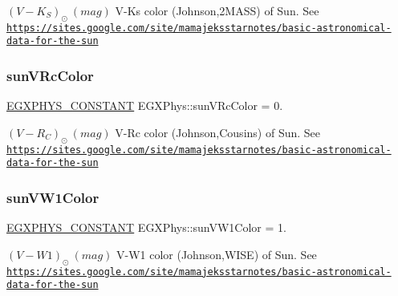 $ (V-K_S)_{\odot} \ (mag)$ V-\/\+Ks color (Johnson,2\+M\+A\+SS) of Sun. See \href{https://sites.google.com/site/mamajeksstarnotes/basic-astronomical-data-for-the-sun}{\tt https\+://sites.\+google.\+com/site/mamajeksstarnotes/basic-\/astronomical-\/data-\/for-\/the-\/sun} \mbox{\label{group___e_g_x_phys-_constants-_astrophysics-_solar_system-_sun-_magnitude_ga746af493327ed0a3ad4ebeead64fc1be}} 
\subsubsection{\texorpdfstring{sun\+V\+Rc\+Color}{sunVRcColor}}
{\footnotesize\ttfamily \mbox{\hyperlink{group___e_g_x_phys-_constants-_macros_ga76980d288494ce1714c9ac68a95ba702}{E\+G\+X\+P\+H\+Y\+S\+\_\+\+C\+O\+N\+S\+T\+A\+NT}} E\+G\+X\+Phys\+::sun\+V\+Rc\+Color = 0.}

$ (V-R_C)_{\odot} \ (mag)$ V-\/\+Rc color (Johnson,Cousins) of Sun. See \href{https://sites.google.com/site/mamajeksstarnotes/basic-astronomical-data-for-the-sun}{\tt https\+://sites.\+google.\+com/site/mamajeksstarnotes/basic-\/astronomical-\/data-\/for-\/the-\/sun} \mbox{\label{group___e_g_x_phys-_constants-_astrophysics-_solar_system-_sun-_magnitude_ga74b675ddfe282224b17cc86eebec62cd}} 
\subsubsection{\texorpdfstring{sun\+V\+W1\+Color}{sunVW1Color}}
{\footnotesize\ttfamily \mbox{\hyperlink{group___e_g_x_phys-_constants-_macros_ga76980d288494ce1714c9ac68a95ba702}{E\+G\+X\+P\+H\+Y\+S\+\_\+\+C\+O\+N\+S\+T\+A\+NT}} E\+G\+X\+Phys\+::sun\+V\+W1\+Color = 1.}

$ (V-W1)_{\odot} \ (mag)$ V-\/\+W1 color (Johnson,W\+I\+SE) of Sun. See \href{https://sites.google.com/site/mamajeksstarnotes/basic-astronomical-data-for-the-sun}{\tt https\+://sites.\+google.\+com/site/mamajeksstarnotes/basic-\/astronomical-\/data-\/for-\/the-\/sun} \mbox{\label{group___e_g_x_phys-_constants-_astrophysics-_solar_system-_sun-_magnitude_gac0bb80d521b0f245fa09f17a5d26e4d2}} 
